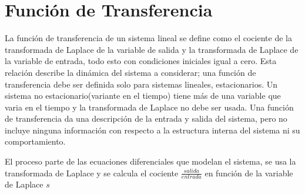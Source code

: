 \documentclass[12pt]{article}
\begin{document}
\section{Función de Transferencia}
La función de transferencia de un sistema lineal se define como el cociente de la transformada de Laplace de la variable de salida y la transformada de Laplace de la variable de entrada, todo esto con condiciones iniciales igual a cero.
Esta relación describe la dinámica del sistema a considerar; una función de transferencia debe ser definida solo para sistemas lineales, estacionarios. Un sistema no estacionario(variante en el tiempo) tiene más de una variable que varia en el tiempo y la transformada de Laplace no debe ser usada. Una función de transferencia da una descripción de la entrada y salida del sistema, pero no incluye ninguna información con respecto a la estructura interna del sistema ni su comportamiento.\cite{dorf2005sistemas}

\vspace{5mm}
El proceso parte de las ecuaciones diferenciales que modelan el sistema, se usa la transformada de Laplace y se calcula el cociente $\frac{salida}{entrada}$ en función de la variable de Laplace $s$
\end{document}
